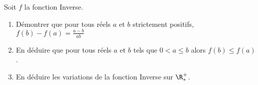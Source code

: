 
Soit $f$ la fonction Inverse.
 \begin{enumerate}
 \item Démontrer que pour tous réels $a$ et $b$ strictement positifs, $f(b)-f(a)=\frac{a-b}{ab}$ 
 \item En déduire que pour tous réels $a$ et $b$ tels que $0<a \leq b$ alors $f(b)\leq f(a)$ .
  \item En déduire les variations de la fonction Inverse sur $\R^+_*$.
 \end{enumerate}